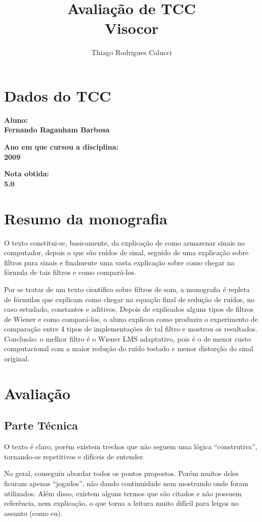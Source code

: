 \documentclass[12pt,a4paper]{article}
\title{Avaliação de TCC\\Visocor}
\author{Thiago Rodrigues Colucci}
\begin{document}
\maketitle

\newpage

\tableofcontents
\newpage
\section{Dados do TCC}
\bf{Aluno:}\\
Fernando Raganham Barbosa

\bf{Ano em que cursou a disciplina:}\\2009


\bf{Nota obtida:}\\5.0


\section{Resumo da monografia}
O texto constitui-se, basicamente, da explicação de como armazenar sinais no computador, depois o que são ruídos de sinal, seguido de uma explicação sobre filtros para sinais e finalmente uma vasta explicação sobre como chegar na fórmula de tais filtros e como compará-los.

Por se tratar de um texto científico sobre filtros de som, a monografia é repleta de fórmulas que explicam como chegar na equação final de redução de ruídos, no caso estudado, constantes e aditivos. Depois de explicados alguns tipos de filtros de Wiener e como compará-los, o aluno explicou como produziu o experimento de comparação entre 4 tipos de implementações de tal filtro e mostrou os resultados. Conclusão: o melhor filtro é o Wiener LMS adaptativo, pois é o de menor custo computacional com a maior redução do ruído testado e menor distorção do sinal original.

\section{Avaliação}
\subsection{Parte Técnica}
O texto é claro, porém existem trechos que não seguem uma lógica ``construtiva'', tornando-os repetitivos e difíceis de entender.

No geral, conseguiu abordar todos os pontos propostos. Porém muitos deles ficaram apenas ``jogados'', não dando continuidade nem mostrando onde foram utilizados. Além disso, existem alguns termos que são citados e não possuem referência, nem explicação, o que torna a leitura muito difícil para leigos no assunto (como eu).
\end{document}
